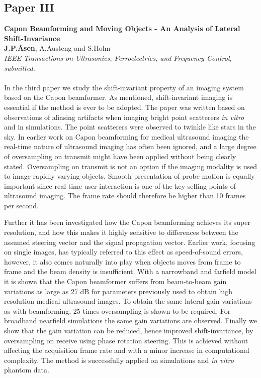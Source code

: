 \subsection{Paper III}
\textbf{Capon Beamforming and Moving Objects - An Analysis of Lateral Shift-Invariance}\\
\textbf{J.\:P.\:\AA{}sen}, A.\:Austeng and S.\:Holm\\
{\it IEEE Transactions on Ultrasonics, Ferroelectrics, and Frequency Control, submitted.}\\\\
In the third paper we study the shift-invariant property of an imaging system based on the Capon beamformer. As mentioned, shift-invariant imaging is essential if the method is ever to be adopted. The paper was written based on observations of aliasing artifacts when imaging bright point scatterers \textit{in vitro} and in simulations. The point scatterers were observed to twinkle like stars in the sky. In earlier work on Capon beamforming for medical ultrasound imaging the real-time nature of ultrasound imaging has often been ignored, and a large degree of oversampling on transmit might have been applied without being clearly stated. Oversampling on transmit is not an option if the imaging modality is used to image rapidly varying objects. Smooth presentation of probe motion is equally important since real-time user interaction is one of the key selling points of ultrasound imaging. The frame rate should therefore be higher than 10 frames per second.

Further it has been investigated how the Capon beamforming achieves its super resolution, and how this makes it highly sensitive to differences between the assumed steering vector and the signal propagation vector. Earlier work, focusing on single images, has typically referred to this effect as speed-of-sound errors, however, it also comes naturally into play when objects moves from frame to frame and the beam density is insufficient. With a narrowband and farfield model it is shown that the Capon beamformer suffers from beam-to-beam gain variations as large as 27 dB for parameters previously used to obtain high resolution medical ultrasound images.  To obtain the same lateral gain variations as with  beamforming, 25 times oversampling is shown to be required. For broadband nearfield simulations the same gain variations are observed. Finally we show that the gain variation can be reduced, hence improved shift-invariance, by oversampling on receive using phase rotation steering. This is achieved without affecting the acquisition frame rate and with a minor increase in computational complexity. The method is successfully applied on simulations and \textit{in vitro} phantom data.

